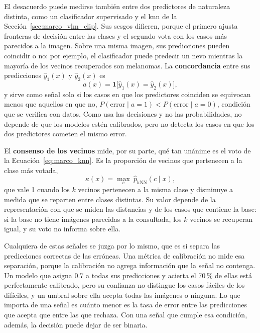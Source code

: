 \label{sec:marco_concordancia}%
El desacuerdo puede medirse también entre dos predictores de naturaleza distinta, como un clasificador
supervisado y el \gls{knn} de la Sección~\ref{sec:marco_vlm_clip}. Sus sesgos difieren, porque el primero ajusta
fronteras de decisión entre las clases y el segundo vota con los casos más parecidos a la imagen. Sobre una
misma imagen, sus predicciones pueden coincidir o no: por ejemplo, el clasificador puede predecir un nevo
mientras la mayoría de los vecinos recuperados son melanomas. La \textbf{concordancia} entre sus predicciones
$\hat{y}_1(x)$ y $\hat{y}_2(x)$ es
\begin{equation}
    a(x) = \mathbf{1}\bigl[\hat{y}_1(x) = \hat{y}_2(x)\bigr],
    \label{eq:marco_concordancia}
\end{equation}
y sirve como señal solo si los casos en que los predictores coinciden se equivocan menos que aquellos en que
no, $P(\text{error} \mid a = 1) < P(\text{error} \mid a = 0)$, condición que se verifica con datos. Como usa
las decisiones y no las probabilidades, no depende de que los modelos estén calibrados, pero no detecta los
casos en que los dos predictores cometen el mismo error.

El \textbf{consenso de los vecinos} mide, por su parte, qué tan unánime es el voto de la
Ecuación~\ref{eq:marco_knn}. Es la proporción de vecinos que pertenecen a la clase más votada,
\begin{equation}
    \kappa(x) = \max_{c}\ \hat{p}_{\text{kNN}}(c \mid x),
    \label{eq:marco_consenso}
\end{equation}
que vale 1 cuando los $k$ vecinos pertenecen a la misma clase y disminuye a medida que se reparten entre clases
distintas. Su valor
depende de la representación con que se miden las distancias y de los casos que contiene la base: si la base no
tiene imágenes parecidas a la consultada, los $k$ vecinos se recuperan igual, y su voto no informa sobre ella.

Cualquiera de estas señales se juzga por lo mismo, que es si separa las predicciones correctas de las erróneas.
Una métrica de calibración no mide esa separación, porque la calibración no agrega información que la señal no
contenga. Un modelo que asigna 0.7 a todas sus predicciones y acierta el 70\,\% de ellas está perfectamente
calibrado, pero su confianza no distingue los casos fáciles de los difíciles, y un umbral sobre ella acepta todas
las imágenes o ninguna. Lo que importa de una señal es cuánto menor es la tasa de error entre las predicciones
que acepta que entre las que rechaza. Con una señal que cumple esa condición, además, la decisión puede dejar de
ser binaria.

